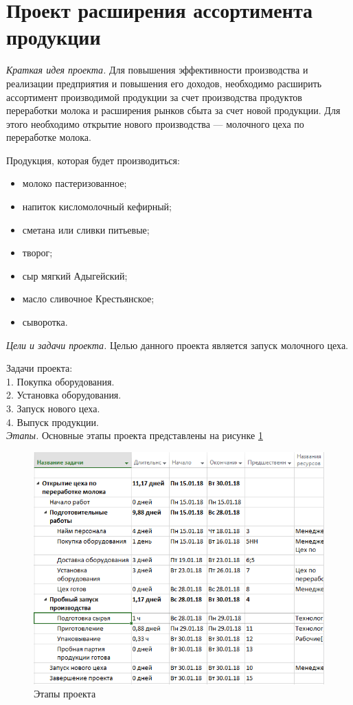 
\section{Проект расширения ассортимента продукции}

\textit{Краткая идея проекта.} Для повышения эффективности производства и реализации предприятия и повышения его доходов, необходимо расширить ассортимент производимой продукции за счет производства продуктов переработки молока и расширения рынков сбыта за счет новой продукции. Для этого необходимо открытие нового производства --- молочного цеха по переработке молока.



Продукция, которая будет производиться:
\begin{itemize}
	\item молоко пастеризованное; 
	\item напиток кисломолочный кефирный; 
	\item сметана или сливки питьевые; 
	\item творог; 
	\item сыр мягкий Адыгейский; 
	\item масло сливочное Крестьянское; 
	\item сыворотка.
\end{itemize} 

\textit{Цели и задачи проекта.} Целью данного проекта является запуск молочного цеха.

Задачи проекта:
\\
1. Покупка оборудования.
\\
2. Установка оборудования.
\\
3. Запуск нового цеха.
\\
4. Выпуск продукции.
\\

\textit{Этапы.}
Основные этапы проекта представлены на рисунке \ref{fig:1}
\begin{figure}[!h]
	\centering
	\includegraphics[width=1\linewidth]{fig1.png}
	\caption{Этапы проекта}
	
	\label{fig:1}
\end{figure}

